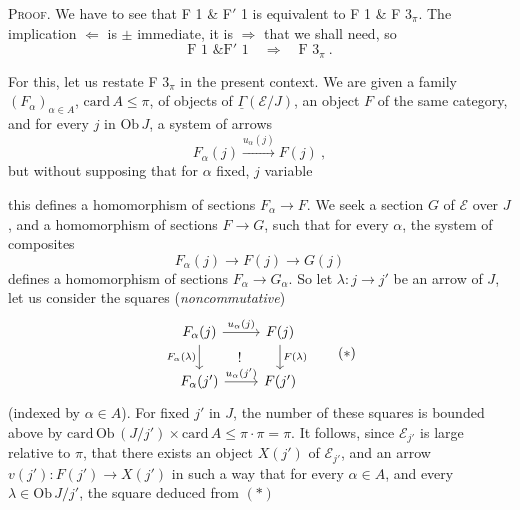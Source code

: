 \documentclass[11pt]{article}
\newcommand{\printedpage}[1]{\marginpar{\footnotesize p.~#1}}
\newcommand{\msp}[1]{\marginpar{\footnotesize [#1]}}
\newcommand{\uGamma}{\underline{\Gamma}}
\newcommand{\Ob}{\mathrm{Ob}\,}
\newcommand{\card}{\mathrm{card}\,}
\begin{document}
\textsc{Proof}. We have to see that F 1 \& F$'$ 1 is equivalent to F 1 \& F $3_\pi$. The implication $\Longleftarrow$ is $\pm$ immediate, it is $\Longrightarrow$ that we shall need, so
\[
\text{F 1 \& F}'\text{ 1} \quad\Longrightarrow\quad \text{F } 3_\pi\ .
\]

\printedpage{95}
For this, let us restate F $3_\pi$ in the present context. We are given a family $(F_\alpha)_{\alpha\in A}$, $\card A\leqslant\pi$, of objects of $\uGamma(\mathcal{E}/J)$, an object $F$ of the same category, and for every $j$ in $\Ob J$, a system of arrows
\[
F_\alpha(j) \xrightarrow{u_\alpha(j)} F(j)\ ,
\]
but without supposing that for $\alpha$ fixed, $j$ variable

\msp{252}
this defines a homomorphism of sections $F_\alpha\longrightarrow F$. We seek a section $G$ of $\mathcal{E}$ over $J$, and a homomorphism of sections $F\longrightarrow G$, such that for every $\alpha$, the system of composites
\[
F_\alpha(j) \longrightarrow F(j) \longrightarrow G(j)
\]
defines a homomorphism of sections $F_\alpha\longrightarrow G_\alpha$. So let $\lambda : j\longrightarrow j'$ be an arrow of $J$, let us consider the squares (\textit{noncommutative}) %
\[
\begin{tikzcd}
F_\alpha(j) \arrow[r,"u_\alpha(j)"] \arrow[d,"F_\alpha(\lambda)"'] \arrow[dr,phantom,"!"] & F(j) \arrow[d,"F(\lambda)"] \\
F_\alpha(j') \arrow[r,"u_\alpha(j')"] & F(j')
\end{tikzcd}
\tag*{$(*)$}
\]
(indexed by $\alpha\in A$). For fixed $j'$ in $J$, the number of these squares is bounded above by $\card\Ob(J/j')\times\card A\leqslant\pi\cdot\pi=\pi$. It follows, since $\mathcal{E}_{j'}$ is large relative to $\pi$, that there exists an object $X(j')$ of $\mathcal{E}_{j'}$, and an arrow $v(j') : F(j')\longrightarrow X(j')$ in such a way that for every $\alpha\in A$, and every $\lambda\in\Ob J/j'$, the square deduced from $(*)$
\end{document}
